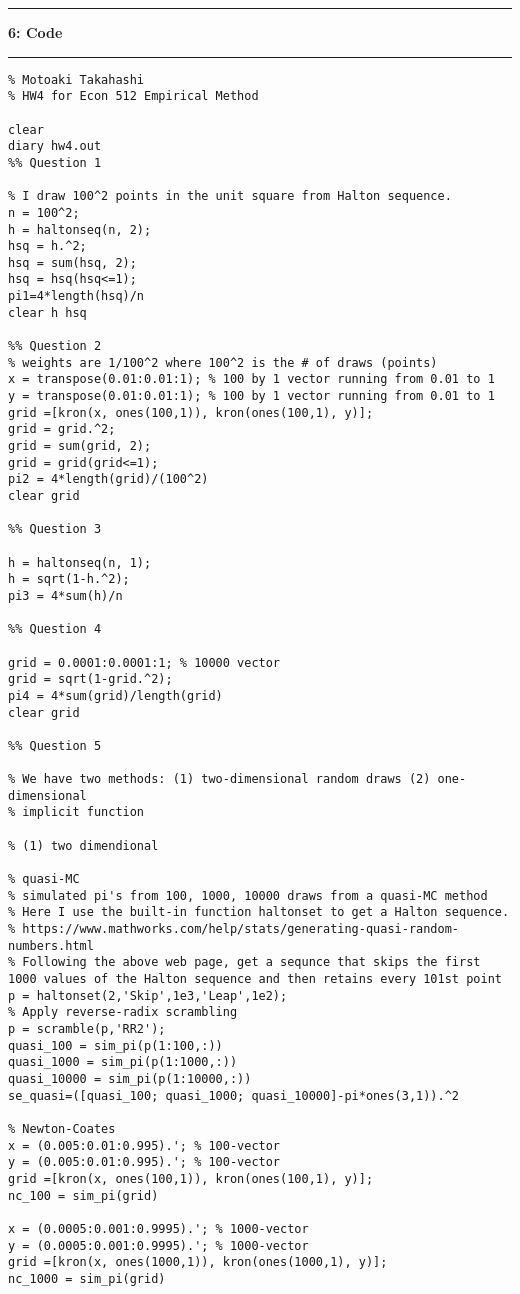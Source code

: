 \documentclass[10pt]{article}
\newcommand\question[2]{\vspace{.25in}\hrule\textbf{#1: #2}\vspace{.5em}\hrule\vspace{.10in}}
\begin{document}
\question{6}{Code}
\begin{tiny}
\begin{verbatim}
% Motoaki Takahashi
% HW4 for Econ 512 Empirical Method

clear
diary hw4.out
%% Question 1

% I draw 100^2 points in the unit square from Halton sequence.
n = 100^2;
h = haltonseq(n, 2);
hsq = h.^2;
hsq = sum(hsq, 2);
hsq = hsq(hsq<=1);
pi1=4*length(hsq)/n
clear h hsq

%% Question 2
% weights are 1/100^2 where 100^2 is the # of draws (points)
x = transpose(0.01:0.01:1); % 100 by 1 vector running from 0.01 to 1
y = transpose(0.01:0.01:1); % 100 by 1 vector running from 0.01 to 1
grid =[kron(x, ones(100,1)), kron(ones(100,1), y)];
grid = grid.^2;
grid = sum(grid, 2);
grid = grid(grid<=1);
pi2 = 4*length(grid)/(100^2)
clear grid

%% Question 3

h = haltonseq(n, 1);
h = sqrt(1-h.^2);
pi3 = 4*sum(h)/n

%% Question 4

grid = 0.0001:0.0001:1; % 10000 vector
grid = sqrt(1-grid.^2);
pi4 = 4*sum(grid)/length(grid)
clear grid

%% Question 5

% We have two methods: (1) two-dimensional random draws (2) one-dimensional
% implicit function

% (1) two dimendional

% quasi-MC
% simulated pi's from 100, 1000, 10000 draws from a quasi-MC method
% Here I use the built-in function haltonset to get a Halton sequence.
% https://www.mathworks.com/help/stats/generating-quasi-random-numbers.html
% Following the above web page, get a sequnce that skips the first 1000 values of the Halton sequence and then retains every 101st point
p = haltonset(2,'Skip',1e3,'Leap',1e2);
% Apply reverse-radix scrambling
p = scramble(p,'RR2');
quasi_100 = sim_pi(p(1:100,:))
quasi_1000 = sim_pi(p(1:1000,:))
quasi_10000 = sim_pi(p(1:10000,:))
se_quasi=([quasi_100; quasi_1000; quasi_10000]-pi*ones(3,1)).^2

% Newton-Coates
x = (0.005:0.01:0.995).'; % 100-vector
y = (0.005:0.01:0.995).'; % 100-vector
grid =[kron(x, ones(100,1)), kron(ones(100,1), y)];
nc_100 = sim_pi(grid)

x = (0.0005:0.001:0.9995).'; % 1000-vector
y = (0.0005:0.001:0.9995).'; % 1000-vector
grid =[kron(x, ones(1000,1)), kron(ones(1000,1), y)];
nc_1000 = sim_pi(grid)


\end{verbatim}
\end{tiny}
\end{document}
